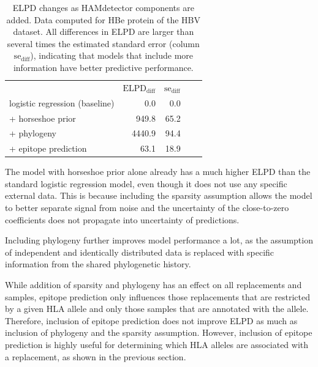 \documentclass{bioinfo}
\begin{document}
\begin{table}
  \renewcommand{\arraystretch}{1.3}
  \centering
  \caption{ELPD changes as HAMdetector components are added. Data computed for HBe protein of the HBV dataset. All differences in ELPD are larger than several times the estimated standard error (column \(\text{se}_\text{diff}\)), indicating that models that include more information have better predictive performance.}
  \vspace{0.5cm}
  \begin{tabular}{l|r|rll}
  \multicolumn{1}{l|}{} & \multicolumn{1}{c|}{\(\text{ELPD}_\text{diff}\)} & \multicolumn{1}{c}{\(\text{se}_\text{diff}\)} &  &  \\ \cline{1-3}
  logistic regression (baseline) & 0.0  & 0.0 &  &  \\
  + horseshoe prior     & 949.8  & 65.2 &  &  \\
  + phylogeny & 4440.9 & 94.4 &  &  \\
  + epitope prediction & 63.1   & 18.9 &  & 
  \end{tabular}
  \label{loo}
\end{table}


The model with horseshoe prior alone already has a much higher ELPD than the standard logistic regression model, even though it does not use any specific external data. This is because including the sparsity assumption allows the model to better separate signal from noise and the uncertainty of the close-to-zero coefficients does not propagate into uncertainty of predictions.

Including phylogeny further improves model performance a lot, as the assumption of independent and identically distributed data is replaced with specific information from the shared phylogenetic history.

While addition of sparsity and phylogeny has an effect on all replacements and samples, epitope prediction only influences those replacements that are restricted by a given HLA allele and only those samples that are annotated with the allele. Therefore, inclusion of epitope prediction does not improve ELPD as much as inclusion of phylogeny and the sparsity assumption. However, inclusion of epitope prediction is highly useful for determining which HLA alleles are associated with a replacement, as shown in the previous section.
\end{document}
